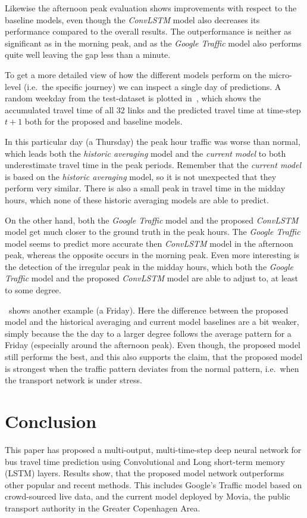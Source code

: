 ﻿\documentclass[preprint,11pt,5p,twocolumn]{elsarticle}
\begin{document}
Likewise the afternoon peak evaluation shows improvements with respect to the baseline models, even though the \emph{ConvLSTM} model also decreases its performance compared to the overall results. The outperformance is neither as significant as in the morning peak, and as the \emph{Google Traffic} model also performs quite well leaving the gap less than a minute. 

To get a more detailed view of how the different models perform on the micro-level (i.e.\ the specific journey) we can inspect a single day of predictions. A random weekday from the test-dataset is plotted in~, which shows the accumulated travel time of all 32 links and the predicted travel time at time-step $t + 1$ both for the proposed and baseline models.

In this particular day (a Thursday) the peak hour traffic was worse than normal, which leads both the \emph{historic averaging} model and the \emph{current model} to both underestimate travel time in the peak periods. Remember that the \emph{current model} is based on the \emph{historic averaging} model, so it is not unexpected that they perform very similar. There is also a small peak in travel time in the midday hours, which none of these historic averaging models are able to predict.

On the other hand, both the \emph{Google Traffic} model and the proposed \emph{ConvLSTM} model get much closer to the ground truth in the peak hours. The \emph{Google Traffic} model seems to predict more accurate then \emph{ConvLSTM} model in the afternoon peak, whereas the opposite occurs in the morning peak. Even more interesting is the detection of the irregular peak in the midday hours, which both the \emph{Google Traffic} model and the proposed \emph{ConvLSTM} model are able to adjust to, at least to some degree.

~shows another example (a Friday). Here the difference between the proposed model and the historical averaging and current model baselines are a bit weaker, simply because the the day to a larger degree follows the average pattern for a Friday (especially around the afternoon peak). Even though, the proposed model still performs the best, and this also supports the claim, that the proposed model is strongest when the traffic pattern deviates from the normal pattern, i.e.\ when the transport network is under stress.

\section{Conclusion}
\label{sec:conclusion}
This paper has proposed a multi-output, multi-time-step deep neural network for bus travel time prediction using Convolutional and Long short-term memory (LSTM) layers. Results show, that the proposed model network outperforms other popular and recent methods. This includes Google's Traffic model based on crowd-sourced live data, and the current model deployed by Movia, the public transport authority in the Greater Copenhagen Area.
\end{document}
